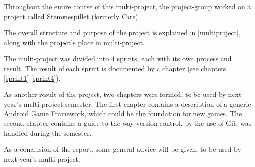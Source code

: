 Throughout the entire course of this multi-project, the project-group worked on a project called Stemmespillet (formerly Cars).

The overall structure and purpose of the project is explained in \cref{multiproject}, along with the project's place in multi-project.

The multi-project was divided into 4 sprints, each with its own process and result.
The result of each sprint is documented by a chapter (see chapters \ref{sprint1}-\ref{sprint4}).

As another result of the project, two chapters were formed, to be used by next year's multi-project semester.
The first chapter contains a description of a generic Android Game Framework, which could be the foundation for new games.
The second chapter contains a guide to the way version control, by the use of Git, was handled during the semester.

As a conclusion of the report, some general advice will be given, to be used by next year's multi-project.
